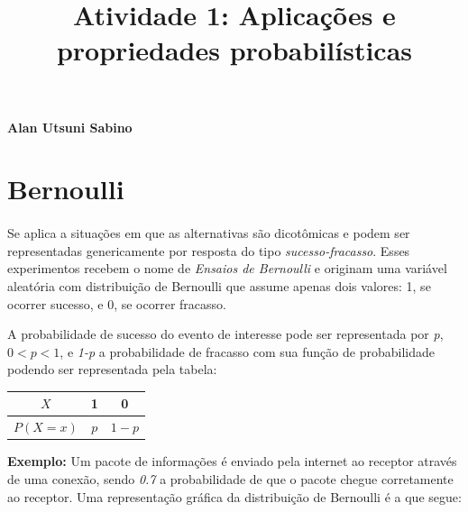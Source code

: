 \documentclass[a4paper,12pt]{article}
\begin{document}
\title{ \large \textbf{Atividade 1: Aplicações e propriedades probabilísticas}}
\date{\vspace{-5ex}}
\maketitle

\begin{flushright}
  { \bf Alan Utsuni Sabino }
\end{flushright}

\section{Bernoulli}

\paragraph{} Se aplica a situações em que as alternativas são
dicotômicas e podem ser representadas genericamente por resposta do
tipo {\it sucesso-fracasso}. Esses experimentos recebem o nome de {\it
  Ensaios de Bernoulli} e originam uma variável aleatória com
distribuição de Bernoulli que assume apenas dois valores: 1, se
ocorrer sucesso, e 0, se ocorrer fracasso.


A probabilidade de sucesso do evento de interesse pode ser
representada por {\it p}, $0<p<1$, e {\it 1-p} a probabilidade de
fracasso com sua função de probabilidade podendo ser representada pela
tabela:

\begin{center}
  \begin{tabular}{c|cc}
    $X$ & 1 & 0 \\
    \hline
    $P(X=x)$ & $p$ & $1-p$
  \end{tabular}
\end{center}

\setlength{\parindent}{0pt} {\bf Exemplo:} Um pacote de informações é
enviado pela internet ao receptor através de uma conexão, sendo {\it
  0.7} a probabilidade de que o pacote chegue corretamente ao
receptor. Uma representação gráfica da distribuição de Bernoulli é a
que segue:
\end{document}
